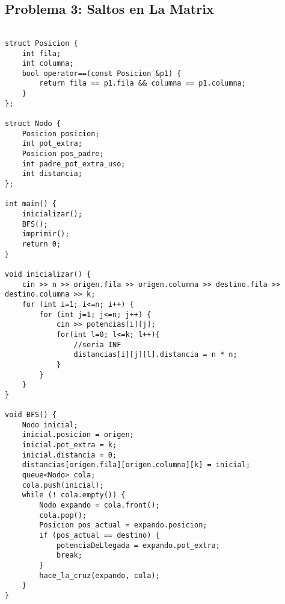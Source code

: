 \documentclass[11pt, a4paper, twoside]{article}
\begin{document}
\subsection{Problema 3: Saltos en La Matrix}

\begin{lstlisting}

struct Posicion {
    int fila;
    int columna;
    bool operator==(const Posicion &p1) {
        return fila == p1.fila && columna == p1.columna;
    }
};

struct Nodo {
    Posicion posicion;
    int pot_extra;
    Posicion pos_padre;
    int padre_pot_extra_uso;
    int distancia;
};

int main() {
    inicializar();
    BFS();
    imprimir();
    return 0;
}

void inicializar() {
    cin >> n >> origen.fila >> origen.columna >> destino.fila >> destino.columna >> k;
    for (int i=1; i<=n; i++) {
        for (int j=1; j<=n; j++) {
            cin >> potencias[i][j];
            for(int l=0; l<=k; l++){
                //seria INF
                distancias[i][j][l].distancia = n * n;
            }
        }
    }
}

void BFS() {
    Nodo inicial;
    inicial.posicion = origen;
    inicial.pot_extra = k;
    inicial.distancia = 0;
    distancias[origen.fila][origen.columna][k] = inicial;
    queue<Nodo> cola;
    cola.push(inicial);
    while (! cola.empty()) {
        Nodo expando = cola.front();
        cola.pop();
        Posicion pos_actual = expando.posicion;
        if (pos_actual == destino) {
            potenciaDeLlegada = expando.pot_extra;
            break;
        }
        hace_la_cruz(expando, cola);
    }
}


\end{lstlisting}
\end{document}
